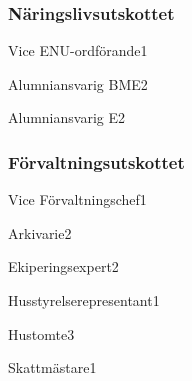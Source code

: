 \documentclass[10pt]{article}
\begin{document}
    \subsubsection{Näringslivsutskottet}
    \begin{vallista}
        \begin{post}{Vice ENU-ordförande}{1}
        \end{post}
        \begin{post}{Alumniansvarig BME}{2}
        \end{post}
        \begin{post}{Alumniansvarig E}{2}
          \vakant
        \end{post} 
    \end{vallista}
    
    \newpage
    
    \subsubsection{Förvaltningsutskottet}
    \begin{vallista}
        \begin{post}{Vice Förvaltningschef}{1}
            \vakant
        \end{post}
        \begin{post}{Arkivarie}{2}
        \end{post}
        \begin{post}{Ekiperingsexpert}{2}
        \end{post}
        \begin{post}{Husstyrelserepresentant}{1}
        \end{post}
        \begin{post}{Hustomte}{3}
        \end{post}
        \begin{post}{Skattmästare}{1}
        \end{post}
    \end{vallista}
    
\end{document}
